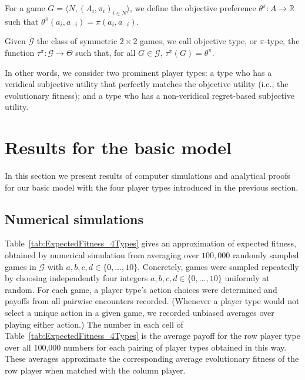 \documentclass[fleqn,reqno,11pt]{article}
\begin{document}
\begin{definition} \label{defn:objpref}

For a game $ G=\langle N, (A_i , \pi_i)_{i \in N} \rangle $, we define the objective preference $ \theta^{\pi}: A \rightarrow \mathbb{R} $ such that $ \theta^{\pi}(a_i,a_{-i})=\pi(a_i,a_{-i}) $.

\end{definition}


\begin{definition} \label{defn:objtype}

Given $ \mathcal{G} $ the class of symmetric $ 2 \times 2 $ games, we call objective type, or $\pi$-type, the function $\tau^{\pi}: \mathcal{G} \rightarrow  \Theta$ such that, for all $G \in \mathcal{G}$, $ \tau^{\pi}(G)= \theta^{\pi}$.

\end{definition}

\noindent In other words, we consider two prominent player types: a type who has a veridical subjective utility that perfectly matches the objective utility (i.e., the evolutionary fitness); and a type who has a non-veridical regret-based subjective utility. 


\section{Results for the basic model}
\label{sec:results:-basic-model}


In this section we present results of computer simulations and analytical proofs for our basic
model with the four player types introduced in the previous section. 

\subsection{Numerical simulations}
\label{sec:numer-simul}

Table~\ref{tab:ExpectedFitness_4Types} gives an approximation of expected fitness, obtained by
numerical simulation from averaging over $100,000$ randomly sampled games in $\mathcal{G}$ with
$a,b,c,d \in \lbrace 0, \dots, 10 \rbrace$. Concretely, games were sampled repeatedly by
choosing independently four integers $a,b,c,d \in \lbrace 0, \dots, 10 \rbrace$ uniformly at
random. For each game, a player type's action choices were determined and payoffs from all
pairwise encounters recorded. (Whenever a player type would not select a unique action in a
given game, we recorded unbiased averages over playing either action.) The number in each cell
of Table~\ref{tab:ExpectedFitness_4Types} is the average payoff for the row player type over
all 100,000 numbers for each pairing of player types obtained in this way. These averages
approximate the corresponding average evolutionary fitness of the row player when matched with
the column player.
\end{document}
